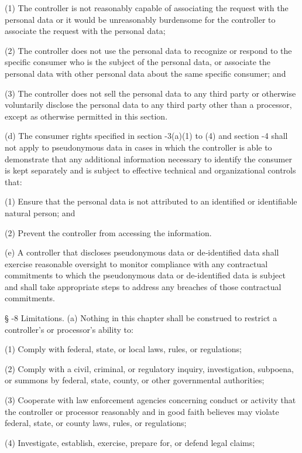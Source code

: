      (1)  The controller is not reasonably capable of associating the request with the personal data or it would be unreasonably burdensome for the controller to associate the request with the personal data;

     (2)  The controller does not use the personal data to recognize or respond to the specific consumer who is the subject of the personal data, or associate the personal data with other personal data about the same specific consumer; and

     (3)  The controller does not sell the personal data to any third party or otherwise voluntarily disclose the personal data to any third party other than a processor, except as otherwise permitted in this section.

     (d)  The consumer rights specified in section    -3(a)(1) to (4) and section    -4 shall not apply to pseudonymous data in cases in which the controller is able to demonstrate that any additional information necessary to identify the consumer is kept separately and is subject to effective technical and organizational controls that:

     (1)  Ensure that the personal data is not attributed to an identified or identifiable natural person; and

     (2)  Prevent the controller from accessing the information.

     (e)  A controller that discloses pseudonymous data or de‑identified data shall exercise reasonable oversight to monitor compliance with any contractual commitments to which the pseudonymous data or de-identified data is subject and shall take appropriate steps to address any breaches of those contractual commitments.

     §   -8  Limitations.  (a)  Nothing in this chapter shall be construed to restrict a controller's or processor's ability to:

     (1)  Comply with federal, state, or local laws, rules, or regulations;

     (2)  Comply with a civil, criminal, or regulatory inquiry, investigation, subpoena, or summons by federal, state, county, or other governmental authorities;

     (3)  Cooperate with law enforcement agencies concerning conduct or activity that the controller or processor reasonably and in good faith believes may violate federal, state, or county laws, rules, or regulations;

     (4)  Investigate, establish, exercise, prepare for, or defend legal claims;


